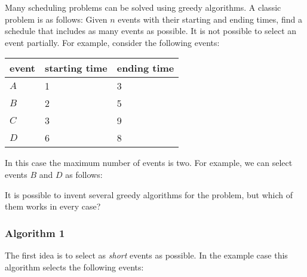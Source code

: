 Many scheduling problems can be solved
using greedy algorithms.
A classic problem is as follows:
Given $n$ events with their starting and ending
times, find a schedule
that includes as many events as possible.
It is not possible to select an event partially.
For example, consider the following events:
\begin{center}
\begin{tabular}{lll}
event & starting time & ending time \\
\hline
$A$ & 1 & 3 \\
$B$ & 2 & 5 \\
$C$ & 3 & 9 \\
$D$ & 6 & 8 \\
\end{tabular}
\end{center}
In this case the maximum number of events is two.
For example, we can select events $B$ and $D$
as follows:
\begin{center}
\end{center}

It is possible to invent several greedy algorithms
for the problem, but which of them works in every case?

\subsubsection*{Algorithm 1}

The first idea is to select as \emph{short}
events as possible.
In the example case this algorithm
selects the following events:
\begin{center}
\end{center}

